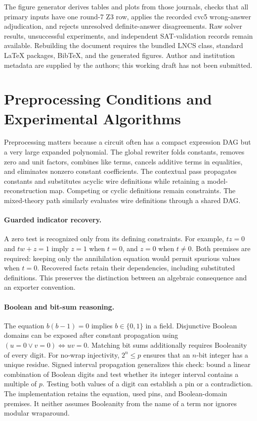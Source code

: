 \documentclass[runningheads]{llncs}
\begin{document}
The figure generator derives tables and plots from those journals, checks that
all primary inputs have one round-7 Z3 row, applies the recorded cvc5 wrong-answer
adjudication, and rejects unresolved definite-answer disagreements. Raw solver
results, unsuccessful experiments, and independent SAT-validation records remain
available. Rebuilding the document requires the bundled LNCS class, standard
LaTeX packages, BibTeX, and the generated figures. Author and institution metadata
are supplied by the authors; this working draft has not been submitted.

\clearpage
\section{Preprocessing Conditions and Experimental Algorithms}
\label{app:preprocess}

Preprocessing matters because a circuit often has a compact expression DAG
but a very large expanded polynomial. The global rewriter folds constants,
removes zero and unit factors, combines like terms, cancels additive terms in
equalities, and eliminates nonzero constant coefficients. The contextual pass
propagates constants and substitutes acyclic wire definitions while retaining
a model-reconstruction map. Competing or cyclic definitions remain constraints.
The mixed-theory path similarly evaluates wire definitions through a shared DAG.

\paragraph{Guarded indicator recovery.}
A zero test is recognized only from its defining constraints. For example,
$t z=0$ and $t w+z=1$ imply $z=1$ when $t=0$, and $z=0$ when $t\ne0$.
Both premises are required: keeping only the annihilation equation would permit
spurious values when $t=0$. Recovered facts retain their dependencies, including
substituted definitions. This preserves the distinction between an algebraic
consequence and an exporter convention.

\paragraph{Boolean and bit-sum reasoning.}
The equation $b(b-1)=0$ implies $b\in\{0,1\}$ in a field. Disjunctive Boolean
domains can be exposed after constant propagation using
$(u=0\lor v=0)\Leftrightarrow uv=0$. Matching bit sums additionally requires
Booleanity of every digit. For no-wrap injectivity, $2^n\le p$ ensures that an
$n$-bit integer has a unique residue. Signed interval propagation generalizes
this check: bound a linear combination of Boolean digits and test whether its
integer interval contains a multiple of $p$. Testing both values of a digit can
establish a pin or a contradiction. The implementation retains the equation,
used pins, and Boolean-domain premises. It neither assumes Booleanity from the
name of a term nor ignores modular wraparound.
\end{document}
